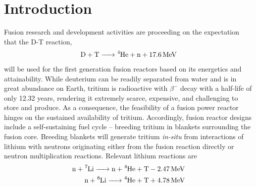 

\chapter{Introduction} \label{sec:introduction}
Fusion research and development activities are proceeding on the expectation that the D-T reaction,
\begin{align}
\ce{D + T -> ^4He + n}+ \SI{17.6}{\mega\electronvolt}
\end{align}
will be used for the first generation fusion reactors based on its energetics and attainability. While deuterium can be readily separated from water and is in great abundance on Earth, tritium is radioactive with $\beta^-$ decay with a half-life of only 12.32 years, rendering it extremely scarce, expensive, and challenging to store and produce. As a consequence, the feasibility of a fusion power reactor hinges on the sustained availability of tritium. Accordingly, fusion reactor designs include a self-sustaining fuel cycle -- breeding tritium in blankets surrounding the fusion core. Breeding blankets will generate tritium \textit{in-situ} from interactions of lithium with neutrons originating either from the fusion reaction directly or neutron multiplication reactions. Relevant lithium reactions are
\begin{align}
\ce{n + ^7Li -> n + ^4He + T}-\SI{2.47}{\mega\electronvolt} \label{eq:Li7T} \\
\ce{n + ^6Li -> ^4He + T} + \SI{4.78}{\mega\electronvolt} \label{eq:Li6T}
\end{align}

